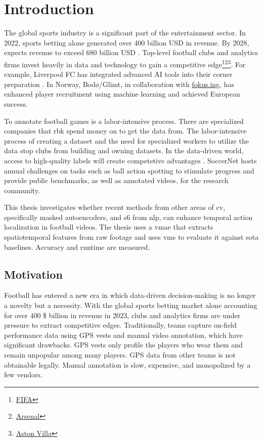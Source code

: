 \chapter{Introduction}
\label{chap:intro}

The global sports industry is a significant part of the entertainment sector. In 2022, sports betting alone generated over 400 billion USD in revenue. By 2028, \textcite{gough_value_2024} expects revenue to exceed 680 billion USD \cite{gough_value_2024}. Top-level football clubs and analytics firms invest heavily in data and technology to gain a competitive edge\footnote{\hyperlink{https://www.linkedin.com/posts/hadisotudeh_hiring-data-architect-activity-7293916472295231488-AwiE/}{FIFA}}\footnote{\hyperlink{https://careers.arsenal.com/jobs/5434108-research-engineer}{Arsenal}}\footnote{\hyperlink{https://www.linkedin.com/posts/hadisotudeh_hiring-dataanalyst-recruitment-activity-7291477919799939072-FhMy/?utm_source=social_share_send&utm_medium=member_desktop_web}{Aston Villa}}. For example, Liverpool FC has integrated advanced AI tools into their corner preparation \cite{wang_tactic_ai_2024}. In Norway, Bodø/Glimt, in collaboration with \hyperlink{https://fokus.ing}{fokus.ing}, has enhanced player recruitment using machine learning and achieved European success.

To annotate football games is a labor-intensive process. There are specialized companies that \acrfull{rbk} spend money on to get the data from. The labor-intensive process of creating a dataset and the need for specialized workers to utilize the data stop clubs from building and owning datasets. In the data-driven world, access to high-quality labels will create competetive advantages \cite{toma_differences_in_football_2023}. SoccerNet hosts annual challenges on tasks such as ball action spotting to stimulate progress and provide public benchmarks, as well as annotated videos, for the research community.

This thesis investigates whether recent methods from other areas of \acrfull{cv}, specifically masked autoencoders, and \acrfull{s6} from \acrfull{nlp}, can enhance temporal action localization in football videos. The thesis uses a \acrfull{vmae} that extracts spatiotemporal features from raw footage and uses \acrfull{vms} to evaluate it against \acrfull{sota} baselines. Accuracy and runtime are measured. 

\section{Motivation}
Football has entered a new era in which data-driven decision-making is no longer a novelty but a necessity. With the global sports betting market alone accounting for over 400 \$ billion in revenue in 2023, clubs and analytics firms are under pressure to extract competitive edges. Traditionally, teams capture on-field performance data using GPS vests and manual video annotation, which have significant drawbacks. GPS vests only profile the players who wear them and remain unpopular among many players. GPS data from other teams is not obtainable legally. Manual annotation is slow, expensive, and monopolized by a few vendors. 


